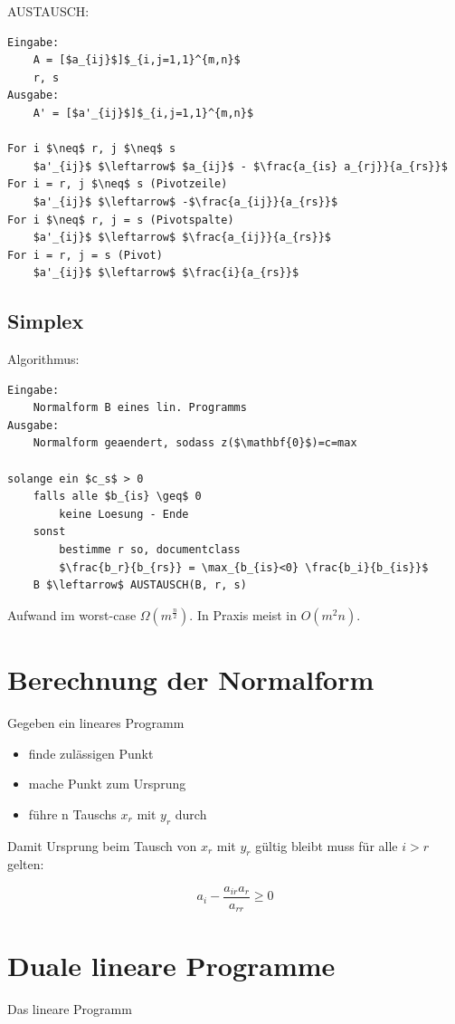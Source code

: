 \documentclass[8pt, DIV15, twocolumn]{scrartcl}
\begin{document}
AUSTAUSCH:

\begin{lstlisting}[mathescape=true]
Eingabe:
	A = [$a_{ij}$]$_{i,j=1,1}^{m,n}$
	r, s
Ausgabe:
	A' = [$a'_{ij}$]$_{i,j=1,1}^{m,n}$

For i $\neq$ r, j $\neq$ s
	$a'_{ij}$ $\leftarrow$ $a_{ij}$ - $\frac{a_{is} a_{rj}}{a_{rs}}$
For i = r, j $\neq$ s (Pivotzeile)
	$a'_{ij}$ $\leftarrow$ -$\frac{a_{ij}}{a_{rs}}$
For i $\neq$ r, j = s (Pivotspalte)
	$a'_{ij}$ $\leftarrow$ $\frac{a_{ij}}{a_{rs}}$
For i = r, j = s (Pivot)
	$a'_{ij}$ $\leftarrow$ $\frac{i}{a_{rs}}$
\end{lstlisting}

\subsection*{Simplex}
Algorithmus:

\begin{lstlisting}[mathescape=true]
Eingabe:
	Normalform B eines lin. Programms
Ausgabe:
	Normalform geaendert, sodass z($\mathbf{0}$)=c=max

solange ein $c_s$ > 0
	falls alle $b_{is} \geq$ 0
		keine Loesung - Ende
	sonst
		bestimme r so, documentclass
		$\frac{b_r}{b_{rs}} = \max_{b_{is}<0} \frac{b_i}{b_{is}}$
	B $\leftarrow$ AUSTAUSCH(B, r, s)
\end{lstlisting}

Aufwand im worst-case $\Omega \left( m^{\frac{n}{2}} \right)$. In Praxis meist in $O \left( m^2 n \right)$.


\section*{Berechnung der Normalform}
Gegeben ein lineares Programm

\begin{itemize}
	\item finde zulässigen Punkt
	\item mache Punkt zum Ursprung
	\item führe n Tauschs $x_r$ mit $y_r$ durch
\end{itemize}

Damit Ursprung beim Tausch von $x_r$ mit $y_r$ gültig bleibt muss für alle $i > r$ gelten:

\begin{equation*}
a_i - \frac{a_{ir} a_r}{a_{rr}} \geq 0
\end{equation*}

\section*{Duale lineare Programme}
Das lineare Programm 
\end{document}
